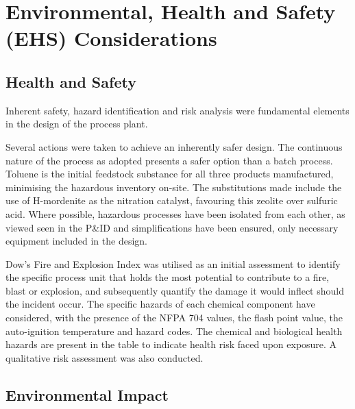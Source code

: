 \section{Environmental, Health and Safety (EHS) Considerations}
\label{sec:ehs}
\subsection{Health and Safety}

Inherent safety, hazard identification and risk analysis were fundamental elements in the design of the process plant. 

Several actions were taken to achieve an inherently safer design. The continuous nature of the process as adopted presents a safer option than a batch process. Toluene is the initial feedstock substance for all three products manufactured, minimising the hazardous inventory on-site. The substitutions made include the use of H-mordenite as the nitration catalyst, favouring this zeolite over sulfuric acid. Where possible, hazardous processes have been isolated from each other, as viewed seen in the P&ID and simplifications have been ensured, only necessary equipment included in the design. 

Dow's Fire and Explosion Index was utilised as an initial assessment to identify the specific process unit that holds the most potential to contribute to a fire, blast or explosion, and subsequently quantify the damage it would inflect should the incident occur. The specific hazards of each chemical component have considered, with the presence of the NFPA 704 values, the flash point value, the auto-ignition temperature and hazard codes. The chemical and biological health hazards are present in the table to indicate health risk faced upon exposure. A qualitative risk assessment was also conducted. %


\subsection{Environmental Impact}
